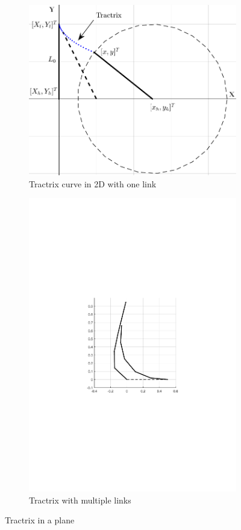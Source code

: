 \documentclass[12pt,a4]{article}
\begin{document}
\begin{figure}[ht!]
    \centering
    \begin{subfigure}{0.48\textwidth}
        \centering
        \includegraphics[width=\linewidth]{figures/fig1.pdf}
        \caption{Tractrix curve in 2D with one link}
        \label{fig:tractrixin2D}
    \end{subfigure}%
    \begin{subfigure}{0.48\textwidth}
        \centering
        \includegraphics[width=0.75\linewidth]{figures/fig2.pdf}
        \caption{Tractrix with multiple links}
    \end{subfigure}
\caption{Tractrix in a plane}
\end{figure}
\end{document}
